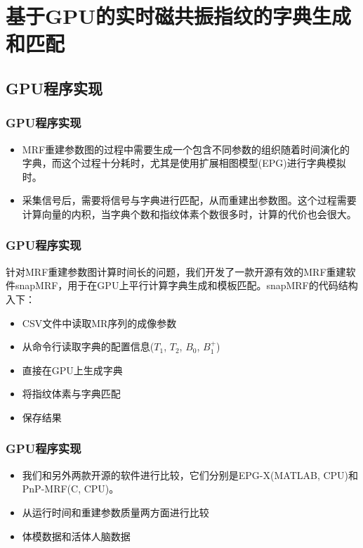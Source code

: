 \documentclass{beamer}
\begin{document}
\section{基于GPU的实时磁共振指纹的字典生成和匹配}

\subsection{GPU程序实现}
\begin{frame}
	\frametitle{GPU程序实现}
	\begin{itemize}
		\item MRF重建参数图的过程中需要生成一个包含不同参数的组织随着时间演化的字典，而这个过程十分耗时，尤其是使用扩展相图模型(EPG)进行字典模拟时。
		\item 采集信号后，需要将信号与字典进行匹配，从而重建出参数图。这个过程需要计算向量的内积，当字典个数和指纹体素个数很多时，计算的代价也会很大。
	\end{itemize}	
\end{frame}

\begin{frame}
	\frametitle{GPU程序实现}
	针对MRF重建参数图计算时间长的问题，我们开发了一款开源有效的MRF重建软件snapMRF，用于在GPU上平行计算字典生成和模板匹配。snapMRF的代码结构入下：
	\begin{itemize}
		\item CSV文件中读取MR序列的成像参数
		\item 从命令行读取字典的配置信息($T_1$, $T_2$, $B_0$, $B_1^+$)
		\item 直接在GPU上生成字典
		\item 将指纹体素与字典匹配
		\item 保存结果
	\end{itemize}
\end{frame}

\begin{frame}
	\frametitle{GPU程序实现}
	\begin{itemize}
		\item 我们和另外两款开源的软件进行比较，它们分别是EPG-X(MATLAB, CPU)和PnP-MRF(C, CPU)。
		\item 从运行时间和重建参数质量两方面进行比较
		\item 体模数据和活体人脑数据
	\end{itemize}
\end{frame}
\end{document}
